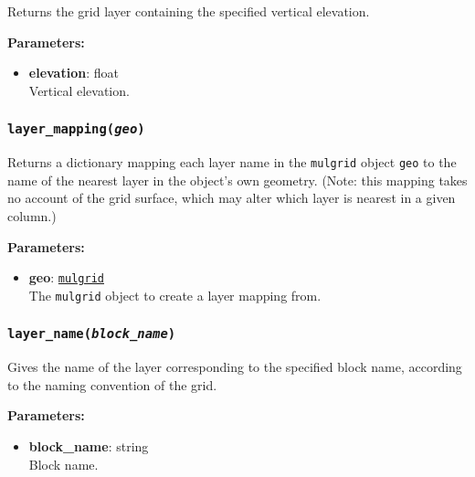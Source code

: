 Returns the grid layer containing the specified vertical elevation.

\textbf{Parameters:}
\begin{itemize}
\item \textbf{elevation}: float\\
  Vertical elevation.
\end{itemize}

\begin{snugshade}\subsubsection{\texttt{layer\_mapping(\emph{geo})}}\end{snugshade}
\label{sec:mulgrid:layer_mapping}

Returns a dictionary mapping each layer name in the \texttt{mulgrid} object \texttt{geo} to the name of the nearest layer in the object's own geometry.  (Note: this mapping takes no account of the grid surface, which may alter which layer is nearest in a given column.)

\textbf{Parameters:}
\begin{itemize}
\item \textbf{geo}: \hyperref[mulgrids]{\texttt{mulgrid}}\\
  The \texttt{mulgrid} object to create a layer mapping from.
\end{itemize}

\begin{snugshade}\subsubsection{\texttt{layer\_name(\emph{block\_name})}}\end{snugshade}
\label{sec:mulgrid:layer_name}

Gives the name of the layer corresponding to the specified block name, according to the naming convention of the grid.

\textbf{Parameters:}
\begin{itemize}
\item \textbf{block\_name}: string\\
  Block name.
\end{itemize}

